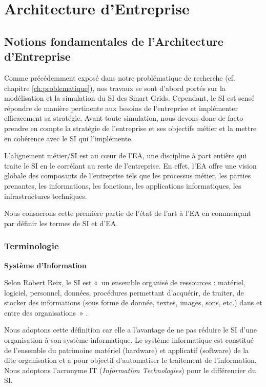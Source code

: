 \chapter{Architecture d'Entreprise}
\label{ch:EA}

\section{Notions fondamentales de l'Architecture d'Entreprise}

Comme précédemment exposé dans notre problématique de recherche (cf. chapitre 
\ref{ch:problematique}), nos travaux se sont d'abord portés sur la modélisation 
et la simulation du SI des Smart Grids. Cependant, le SI est sensé répondre de 
manière pertinente aux besoins de l'entreprise et implémenter efficacement sa 
stratégie. Avant toute simulation, nous devons donc de facto prendre en compte 
la stratégie de l'entreprise et ses objectifs métier et la mettre en cohérence 
avec le SI qui l'implémente.

L'alignement métier/SI est au cœur de l'EA, une discipline à part entière qui 
traite le SI en le corrélant au reste de l'entreprise. En effet, l'EA offre une 
vision globale des composants de l'entreprise tels que les processus métier, les 
parties prenantes, les informations, les fonctions, les applications 
informatiques, les infrastructures techniques. 

Nous consacrons cette première partie de l'état de l'art à l'EA en commençant 
par définir les termes de SI et d'EA. 
 
	\subsection{Terminologie}
	
\textbf{Système d'Information}


Selon Robert Reix, le SI est «~un ensemble organisé de ressources : matériel, 
logiciel, personnel, données, procédures permettant d'acquérir, de traiter, de 
stocker des informations (sous forme de donnée, textes, images, sons, etc.) dans 
et entre des organisations~» \cite{reix1995systemes}.

Nous adoptons cette définition car elle a l'avantage de ne pas réduire le SI 
d'une organisation à son système informatique. Le système informatique est 
constitué de l'ensemble du patrimoine matériel (hardware) et applicatif 
(software) de la dite 
organisation et a pour objectif d'automatiser le traitement de l'information. 
Nous adoptons l'acronyme IT (\textit{Information Technologies}) pour le 
différencier du SI.

